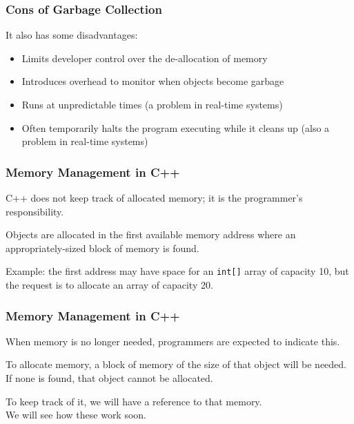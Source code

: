 \begin{frame}
\frametitle{Cons of Garbage Collection}

It also has some disadvantages:
\begin{itemize}
	\item Limits developer control over the de-allocation of memory
	\item Introduces overhead to monitor when objects become garbage
	\item Runs at unpredictable times (a problem in real-time systems)
	\item Often temporarily halts the program executing while it cleans up (also a problem in real-time systems)
\end{itemize}
\end{frame}

\begin{frame}
\frametitle{Memory Management in C++}

C++ does not keep track of allocated memory; it is the programmer's responsibility.

Objects are allocated in the first available memory address where an appropriately-sized block of memory is found.

Example: the first address may have space for an \texttt{int[]} array of capacity 10, but the request is to allocate an array of capacity 20.

\end{frame}

\begin{frame}
\frametitle{Memory Management in C++}

When memory is no longer needed, programmers are expected to indicate this.

To allocate memory, a block of memory of the size of that object will be needed. If none is found, that object cannot be allocated.

To keep track of it, we will have a reference to that memory.\\
\quad We will see how these work soon.

\end{frame}




